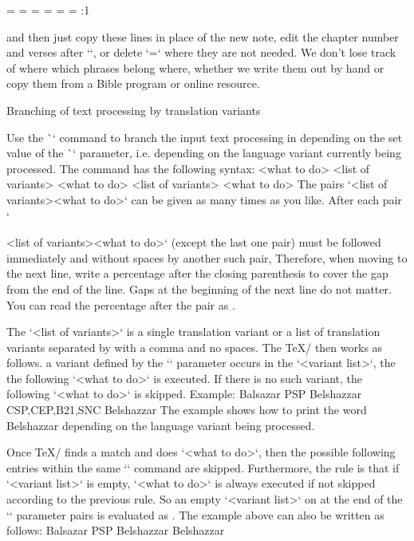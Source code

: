 {{{{\begtt
\ww {}={} %
    {}={} %
    {}={} %
    {}={} %
    {}={} %
    {}={} %
\1:1 {}
\endtt

and then just copy these lines in place of the new note, edit the chapter number and verses after `\Note`, or delete `={}` where they are not needed. We don't lose track of where
which phrases belong where, whether we write them out by hand or copy them from a Bible program or online resource.



\secc[switch] Branching of text processing by translation variants

Use the \`\switch` command to branch the input text processing in
depending on the set value of the \`\tmark` parameter, i.e. depending on
the language variant currently being processed. The command has the following syntax:
\begtt
{} {<what to do>}%
        {<list of variants>} {<what to do>}%
        {<list of variants>} {<what to do>}
\endtt
The pairs `{<list of variants>}{<what to do>}` can be given as many times as you like.
After each pair `{{<list of variants>}{<what to do>}` (except the last one
pair) must be followed immediately and without spaces by another such pair,
Therefore, when moving to
the next line, write a percentage after the closing parenthesis to cover the gap from
the end of the line. Gaps at the beginning of the next line do not matter.
You can read the percentage after the pair as .

The `<list of variants>` is
a single translation variant or a list of translation variants separated by
with a comma and no spaces. The \TeX/ then works as follows.
a variant defined by the `\mark` parameter occurs in the `<variant list>`, the
the following `<what to do>` is executed. If there is no such variant,
the following `<what to do>` is skipped. Example:
\begtt
{} {Balsazar}%
        {PSP} {Belshazzar}%
        {CSP,CEP,B21,SNC} {Belshazzar}
\endtt
The example shows how to print the word Belshazzar depending on
the language variant being processed.

Once \TeX/ finds a match and does `<what to do>`, then the possible following
entries within the same `\switch` command are skipped. Furthermore, the rule is that
if `<variant list>` is empty, `<what to do>` is always executed if
not skipped according to the previous rule. So an empty `<variant list>` on
at the end of the `\switch` parameter pairs is evaluated as . The example above can also be written as follows:
\begtt
{} {Balsazar}%
        {PSP} {Belshazzar}%
        {} {Belshazzar}
\endtt

}}}}}
